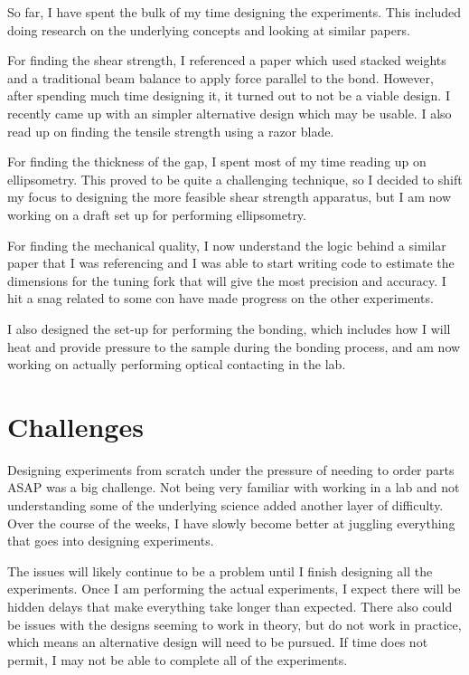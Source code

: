 \documentclass[colorlinks=true,pdfstartview=FitV,linkcolor=blue,
            citecolor=red,urlcolor=magenta]{ligodoc}
\begin{document}
So far, I have spent the bulk of my time designing the experiments. This included doing research on the underlying concepts and looking at similar papers.

For finding the shear strength, I referenced a paper which used stacked weights and a traditional beam balance to apply force parallel to the bond. However, after spending much time designing it, it turned out to not be a viable design. I recently came up with an simpler alternative design which may be usable. I also read up on finding the tensile strength using a razor blade.

For finding the thickness of the gap, I spent most of my time reading up on ellipsometry. This proved to be quite a challenging technique, so I decided to shift my focus to designing the more feasible shear strength apparatus, but I am now working on a draft set up for performing ellipsometry.

For finding the mechanical quality, I now understand the logic behind a similar paper that I was referencing and I was able to start writing code to estimate the dimensions for the tuning fork that will give the most precision and accuracy. I hit a snag related to some con have made progress on the other experiments.

I also designed the set-up for performing the bonding, which includes how I will heat and provide pressure to the sample during the bonding process, and am now working on actually performing optical contacting in the lab.

\section{Challenges}

Designing experiments from scratch under the pressure of needing to order parts ASAP was a big challenge. Not being very familiar with working in a lab and not understanding some of the underlying science added another layer of difficulty. Over the course of the weeks, I have slowly become better at juggling everything that goes into designing experiments.

The issues will likely continue to be a problem until I finish designing all the experiments. Once I am performing the actual experiments, I expect there will be hidden delays that make everything take longer than expected. There also could be issues with the designs seeming to work in theory, but do not work in practice, which means an alternative design will need to be pursued. If time does not permit, I may not be able to complete all of the experiments.
\end{document}
